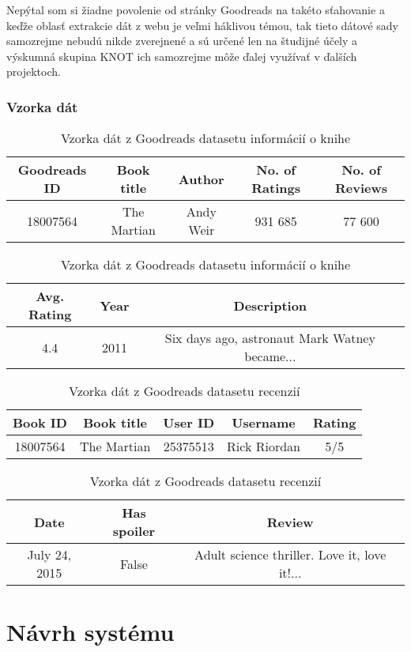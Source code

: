 Nepýtal som si žiadne povolenie od stránky Goodreads na takéto sťahovanie a keďže oblasť extrakcie dát z webu je veľmi háklivou témou, tak tieto dátové sady samozrejme nebudú nikde zverejnené a sú určené len na študijné účely a výskumná skupina KNOT ich samozrejme môže ďalej využívať v ďalších projektoch.

\subsection*{Vzorka dát}

\begin{table}[hbt]
\centering
\caption{Vzorka dát z Goodreads datasetu informácií o knihe}
\label{bookinfo}
\begin{tabular}{|c|c|c|c|c|}
\hline
Goodreads ID & Book title & Author & No. of Ratings & No. of Reviews  \\
\hline
18007564 & The Martian & Andy Weir & 931 685 & 77 600\\ 
\hline
\end{tabular}
\begin{tabular}{|c|c|c|}
\hline
Avg. Rating & Year & Description \\
\hline
4.4  & 2011 & Six days ago, astronaut Mark Watney became... \\ 
\hline
\end{tabular}
\end{table}

\begin{table}[hbt]
\centering
\caption{Vzorka dát z Goodreads datasetu recenzií}
\label{reviewinfo}
\begin{tabular}{|c|c|c|c|c|}
\hline
Book ID & Book title & User ID  & Username & Rating  \\
\hline
18007564 & The Martian & 25375513 & Rick Riordan & 5/5\\ 
\hline
\end{tabular}
\begin{tabular}{|c|c|c|}
\hline
Date & Has spoiler & Review \\
\hline
July 24, 2015  & False & Adult science thriller.  Love it, love it!...\\ 
\hline
\end{tabular}
\end{table}


\chapter{Návrh systému}
\label{navrh}

